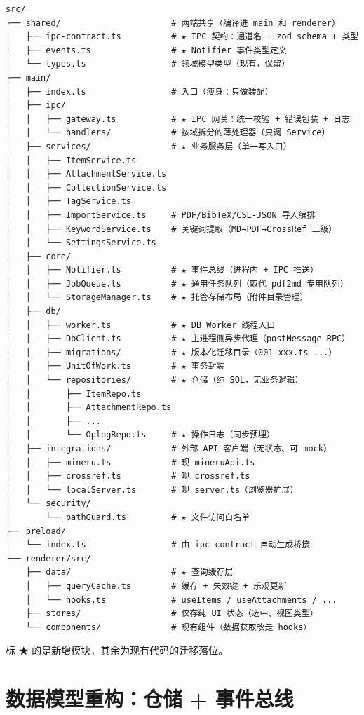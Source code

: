 \documentclass[12pt, a4paper]{article}
\begin{document}
\begin{lstlisting}[language={},numbers=none]
src/
├── shared/                      # 两端共享（编译进 main 和 renderer）
│   ├── ipc-contract.ts          # ★ IPC 契约：通道名 + zod schema + 类型
│   ├── events.ts                # ★ Notifier 事件类型定义
│   └── types.ts                 # 领域模型类型（现有，保留）
├── main/
│   ├── index.ts                 # 入口（瘦身：只做装配）
│   ├── ipc/
│   │   ├── gateway.ts           # ★ IPC 网关：统一校验 + 错误包装 + 日志
│   │   └── handlers/            # 按域拆分的薄处理器（只调 Service）
│   ├── services/                # ★ 业务服务层（单一写入口）
│   │   ├── ItemService.ts
│   │   ├── AttachmentService.ts
│   │   ├── CollectionService.ts
│   │   ├── TagService.ts
│   │   ├── ImportService.ts     # PDF/BibTeX/CSL-JSON 导入编排
│   │   ├── KeywordService.ts    # 关键词提取（MD→PDF→CrossRef 三级）
│   │   └── SettingsService.ts
│   ├── core/
│   │   ├── Notifier.ts          # ★ 事件总线（进程内 + IPC 推送）
│   │   ├── JobQueue.ts          # ★ 通用任务队列（取代 pdf2md 专用队列）
│   │   └── StorageManager.ts    # ★ 托管存储布局（附件目录管理）
│   ├── db/
│   │   ├── worker.ts            # ★ DB Worker 线程入口
│   │   ├── DbClient.ts          # ★ 主进程侧异步代理（postMessage RPC）
│   │   ├── migrations/          # ★ 版本化迁移目录（001_xxx.ts ...）
│   │   ├── UnitOfWork.ts        # ★ 事务封装
│   │   └── repositories/        # ★ 仓储（纯 SQL，无业务逻辑）
│   │       ├── ItemRepo.ts
│   │       ├── AttachmentRepo.ts
│   │       ├── ...
│   │       └── OplogRepo.ts     # ★ 操作日志（同步预埋）
│   ├── integrations/            # 外部 API 客户端（无状态、可 mock）
│   │   ├── mineru.ts            # 现 mineruApi.ts
│   │   ├── crossref.ts          # 现 crossref.ts
│   │   └── localServer.ts       # 现 server.ts（浏览器扩展）
│   └── security/
│       └── pathGuard.ts         # ★ 文件访问白名单
├── preload/
│   └── index.ts                 # 由 ipc-contract 自动生成桥接
└── renderer/src/
    ├── data/                    # ★ 查询缓存层
    │   ├── queryCache.ts        # 缓存 + 失效键 + 乐观更新
    │   └── hooks.ts             # useItems / useAttachments / ...
    ├── stores/                  # 仅存纯 UI 状态（选中、视图类型）
    └── components/              # 现有组件（数据获取改走 hooks）
\end{lstlisting}

标 ★ 的是新增模块，其余为现有代码的迁移落位。

\section{数据模型重构：仓储 + 事件总线}
\end{document}
